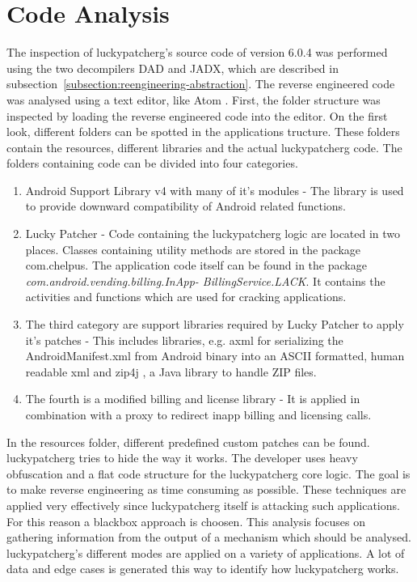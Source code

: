 \section{Code Analysis} \label{section:luckypatcher-analysis}
The inspection of \gls{luckypatcherg}'s source code of version 6.0.4 was performed using the two decompilers DAD and JADX, which are described in subsection~\ref{subsection:reengineering-abstraction}.
The reverse engineered code was analysed using a text editor, like Atom \cite{atom}.
\newline
First, the folder structure was inspected by loading the reverse engineered code into the editor.
On the first look, different folders can be spotted in the applications tructure.
These folders contain the resources, different libraries and the actual \gls{luckypatcherg} code.
The folders containing code can be divided into four categories.
\begin{enumerate}
\item Android Support Library v4 with many of it's modules -
The library is used to provide downward compatibility of Android related functions.
\item Lucky Patcher -
Code containing the \gls{luckypatcherg} logic are located in two places.
Classes containing utility methods are stored in the package com.chelpus.
The application code itself can be found in the package
\textit{com.android.vending.billing.InApp- BillingService.LACK}.
It contains the activities and functions which are used for cracking applications.
\item The third category are support libraries required by Lucky Patcher to apply it's patches -
This includes libraries, e.g. axml \cite{axml} for serializing the AndroidManifest.xml from Android binary into an ASCII formatted, human readable xml and zip4j \cite{zip4j}, a Java library to handle ZIP files.
\item The fourth is a modified billing and license library -
It is applied in combination with a proxy to redirect inapp billing and licensing calls.
\end{enumerate}
In the resources folder, different predefined custom patches can be found.
\newline
\newline
\gls{luckypatcherg} tries to hide the way it works.
The developer uses heavy obfuscation and a flat code structure for the \gls{luckypatcherg} core logic.
The goal is to make reverse engineering as time consuming as possible.
These techniques are applied very effectively since \gls{luckypatcherg} itself is attacking such applications.
For this reason a blackbox approach is choosen.
This analysis focuses on gathering information from the output of a mechanism which should be analysed.
\gls{luckypatcherg}'s different modes are applied on a variety of applications. A lot of data and edge cases is generated this way to identify how \gls{luckypatcherg} works.
